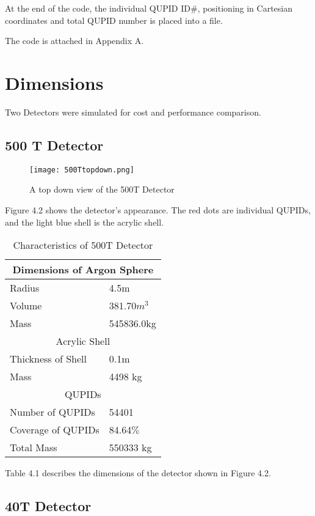 \documentclass[11pt,a4paper,oneside]{report}
\begin{document}
At the end of the code, the individual QUPID ID$\#$, positioning in Cartesian coordinates and total QUPID number is placed into a file.

The code is attached in Appendix A.
\newpage
\section{Dimensions}
Two Detectors were simulated for cost and performance comparison.

\subsection{500 T Detector}

\begin{figure}[h]
\centering
\texttt{[image: 500Ttopdown.png]}
\caption{A top down view of the 500T Detector}
\end{figure}

Figure 4.2 shows the detector's appearance. The red dots are individual QUPIDs, and the light blue shell is the acrylic shell. 

\begin{table}[h]
\caption{Characteristics of 500T Detector}
\begin{center}
    \begin{tabular}{ | l | l |}
    \hline
	\multicolumn{2}{|c|}{Dimensions of Argon Sphere} \\
 	\hline
	Radius & 4.5m \\ \hline
	Volume & 381.70$m^3$  \\ \hline
	Mass & 545836.0kg \\ \hline
	\multicolumn{2}{|c|}{Acrylic Shell} \\ \hline
	Thickness of Shell & 0.1m \\ \hline
	Mass & 4498 kg \\ \hline
	\multicolumn{2}{|c|}{QUPIDs} \\ \hline
	Number of QUPIDs & 54401 \\ \hline
	Coverage of QUPIDs & 84.64$\%$ \\ \hline \hline
	Total Mass & 550333 kg \\ \hline    
	\hline
    \end{tabular}
\end{center}
\end{table}

Table 4.1 describes the dimensions of the detector shown in Figure 4.2. 

\newpage
\subsection{40T Detector}
\end{document}
